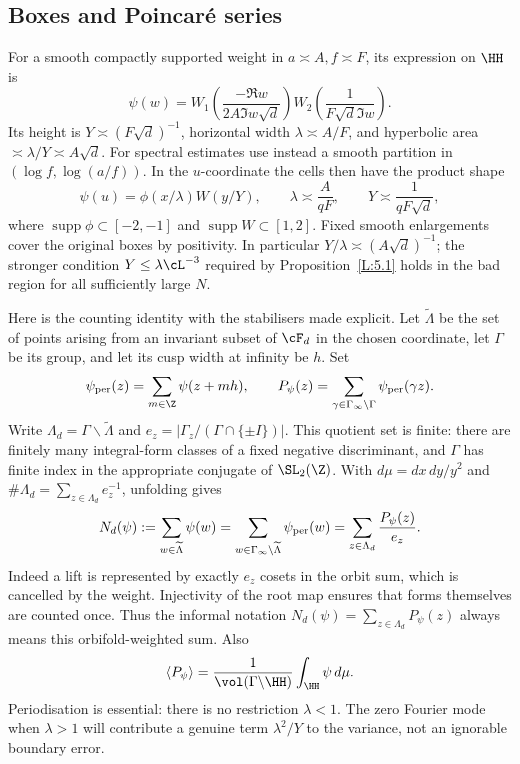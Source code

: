 \subsection{Boxes and Poincar\'e series}
For a smooth compactly supported weight in $a\asymp A,f\asymp F$, its
expression on $\HH$ is
\[
 \psi(w)=W_1\!\left(\frac{-\Re w}{2A\Im w\sqrt d}\right)
          W_2\!\left(\frac1{F\sqrt d\Im w}\right).
\]
Its height is $Y\asymp(F\sqrt d)^{-1}$, horizontal width
$\lambda\asymp A/F$, and hyperbolic area $\asymp\lambda/Y\asymp A\sqrt d$.
For spectral estimates use instead a smooth partition in
$(\log f,\log(a/f))$. In the $u$-coordinate the cells then have the
product shape
\begin{equation}\label{A:eq:box}
 \psi(u)=\phi(x/\lambda)W(y/Y),\qquad
 \lambda\asymp\frac A{qF},\qquad Y\asymp\frac1{qF\sqrt d},
\end{equation}
where $\operatorname{supp}\phi\subset[-2,-1]$ and
$\operatorname{supp}W\subset[1,2]$.
Fixed smooth enlargements cover the original boxes by positivity. In
particular $Y/\lambda\asymp(A\sqrt d)^{-1}$; the stronger condition
$Y\le\lambda\cL^{-3}$ required by Proposition~\ref{L:5.1} holds in the
bad region for all sufficiently large $N$.

Here is the counting identity with the stabilisers made explicit.
Let $\widetilde\Lambda$ be the set of points arising from an invariant
subset of $\cF_d$ in the chosen coordinate, let $\Gamma$ be its group,
and let its cusp width at infinity be $h$. Set
\[
 \psi_{\rm per}(z)=\sum_{m\in\Z}\psi(z+mh),\qquad
 P_\psi(z)=\sum_{\gamma\in\Gamma_\infty\backslash\Gamma}
                                     \psi_{\rm per}(\gamma z).
\]
Write $\Lambda_d=\Gamma\backslash\widetilde\Lambda$ and
$e_z=|\Gamma_z/(\Gamma\cap\{\pm I\})|$. This quotient set is finite:
there are finitely many integral-form classes of a fixed negative
discriminant, and $\Gamma$ has finite index in the appropriate conjugate
of $\SL_2(\Z)$. With $d\mu=dx\,dy/y^2$ and
$\#\Lambda_d=\sum_{z\in\Lambda_d}e_z^{-1}$, unfolding gives
\begin{equation}\label{A:eq:countidentity}
 N_d(\psi):=\sum_{w\in\widetilde\Lambda}\psi(w)
 =\sum_{w\in\Gamma_\infty\backslash\widetilde\Lambda}\psi_{\rm per}(w)
 =\sum_{z\in\Lambda_d}\frac{P_\psi(z)}{e_z}.
\end{equation}
Indeed a lift is represented by exactly $e_z$ cosets in the orbit sum,
which is cancelled by the weight. Injectivity of the root map ensures
that forms themselves are counted once. Thus the informal notation
$N_d(\psi)=\sum_{z\in\Lambda_d}P_\psi(z)$ always means this orbifold-weighted
sum. Also
\[
 \langle P_\psi\rangle=
       \frac1{\vol(\Gamma\backslash\HH)}\int_{\HH}\psi\,d\mu.
\]
Periodisation is essential: there is no restriction $\lambda<1$.
The zero Fourier mode when $\lambda>1$ will contribute a genuine term
$\lambda^2/Y$ to the variance, not an ignorable boundary error.

